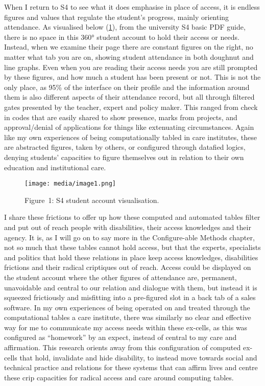 When I return to S4 to see what it does emphasise in place of access, it
is endless figures and values that regulate the student's progress,
mainly orienting attendance. As visualised below (\cref{fig:360}), from
the university S4 basic PDF guide, there is no space in this 360°
student account to hold their access or needs. Instead, when we examine
their page there are constant figures on the right, no matter what tab
you are on, showing student attendance in both doughnut and line graphs.
Even when you are reading their access needs you are still prompted by
these figures, and how much a student has been present or not. This is
not the only place, as 95\% of the interface on their profile and the
information around them is also different aspects of their attendance
record, but all through filtered gates presented by the teacher, expert
and policy maker. This ranged from check in codes that are easily shared
to show presence, marks from projects, and approval/denial of
applications for things like extenuating circumstances. Again like my
own experiences of being computationally tabled in care institutes,
these are abstracted figures, taken by others, or configured through
datafied logics, denying students' capacities to figure themselves out
in relation to their own education and institutional care.

\begin{figure}
\hypertarget{fig:360}{%
\centering
\texttt{[image: media/image1.png]}
\caption{Figure~1: S4 student account visualisation.}\label{fig:360}
}
\end{figure}

I share these frictions to offer up how these computed and automated
tables filter and put out of reach people with disabilities, their
access knowledges and their agency. It is, as I will go on to say more
in the Configure-able Methods chapter, not so much that these tables
cannot hold access, but that the experts, specialists and politics that
hold these relations in place keep access knowledges, disabilities
frictions and their radical criptiques out of reach. Access could be
displayed on the student account where the other figures of attendance
are, permanent, unavoidable and central to our relation and dialogue
with them, but instead it is squeezed frictiously and misfitting into a
pre-figured slot in a back tab of a sales software. In my own
experiences of being operated on and treated through the computational
tables a care institute, there was similarly no clear and effective way
for me to communicate my access needs within these ex-cells, as this was
configured as ``homework'' by an expect, instead of central to my care
and affirmation. This research orients away from this configuration of
computed ex-cells that hold, invalidate and hide disability, to instead
move towards social and technical practice and relations for these
systems that can affirm lives and centre these crip capacities for
radical access and care around computing tables.

